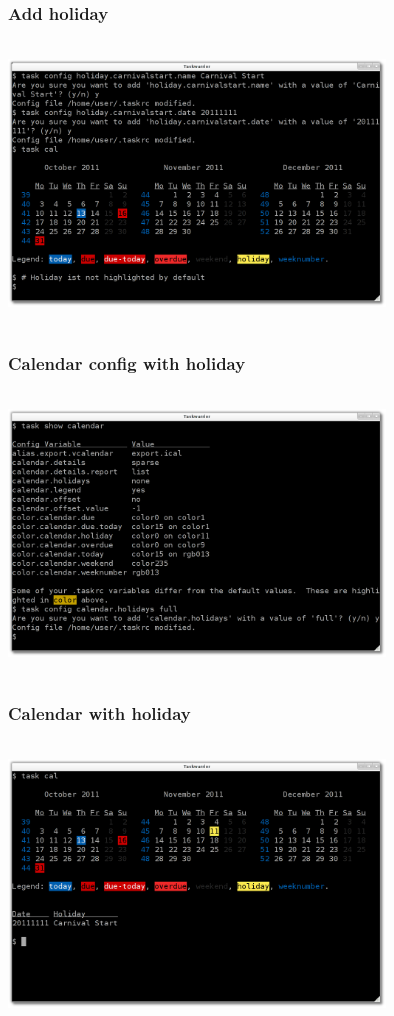 \documentclass[t,handout]{beamer}
\begin{document}
\begin{frame}
\frametitle{Add holiday}
\begin{center}
\includegraphics[width=10cm,height=7.5cm]{holiday_add.png}
\end{center}
\end{frame}

\begin{frame}
\frametitle{Calendar config with holiday}
\begin{center}
\includegraphics[width=10cm,height=7.5cm]{calendar_config_with_holiday_name.png}
\end{center}
\end{frame}

\begin{frame}
\frametitle{Calendar with holiday}
\begin{center}
\includegraphics[width=10cm,height=7.5cm]{calendar_with_holiday_name.png}
\end{center}
\end{frame}
\end{document}
